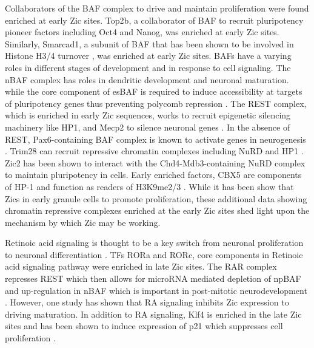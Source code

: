 \documentclass[fleqn,10pt]{wlscirep}
\begin{document}
Collaborators of the BAF complex to drive and maintain proliferation were found enriched at early Zic sites. Top2b, a collaborator of BAF to recruit pluripotency pioneer factors including Oct4 and Nanog, was enriched at early Zic sites. Similarly,  Smarcad1, a subunit of BAF that has been shown to be involved in Histone H3/4 turnover \cite{Markert2021Smarcad1Activity}, was  enriched at early Zic sites. BAFs have a varying roles in different stages of development and in response to cell signaling. The nBAF complex has roles in dendritic development and neuronal maturation. \cite{Alfert2019TheDisease} while the core component of esBAF is required to induce accessibility at targets of pluripotency genes thus preventing polycomb repression \cite{Ho2011EsBAFFunction}. The REST complex, which is enriched in early Zic sequences, works to recruit epigenetic silencing machinery like HP1, and Mecp2 to silence neuronal genes \cite{Ballas2005TheGenes}. In the absence of REST, Pax6-containing BAF complex is known to activate genes in neurogenesis \cite{Ninkovic2013TheNetwork, Tuoc2013ChromatinThickness}. Trim28 can recruit repressive chromatin complexes including NuRD and HP1 \cite{Sripathy2006TheRepression}. Zic2 has been shown to interact with the Chd4-Mdb3-containing NuRD complex to maintain pluripotency in cells\cite{Luo2015Zic2Specification}. Early enriched factors, CBX5 are components of HP-1 and function as readers of H3K9me2/3 \cite{vanWijnen2021BiologicalDevelopment}. While it has been show that Zics in early granule cells to promote proliferation, these additional data showing chromatin repressive complexes enriched at the early Zic sites shed light upon the mechanism by which Zic may be working. 



Retinoic acid signaling is thought to be a key switch from neuronal proliferation to neuronal differentiation \cite{Janesick2015RetinoicDifferentiation}. TFs RORa and RORc, core components in Retinoic acid signaling pathway were enriched in late Zic sites. The RAR complex represses REST which then allows for microRNA mediated depletion of npBAF and up-regulation in nBAF which is important in post-mitotic neurodevelopment \cite{Alfert2019TheDisease}. However, one study has shown that RA signaling inhibits Zic expression \cite{Janesick2013ERFNeurogenesis} to driving maturation. In addition to RA signaling, Klf4 is enriched in the late Zic sites and has been shown to induce expression of p21 which suppresses cell proliferation \cite{Zhang2000ThePromoter}. 
\end{document}
